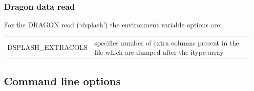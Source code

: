 \documentclass[a4paper,10pt]{article}
\begin{document}
\subsubsection{ Dragon data read}
 For the DRAGON read (`dsplash') the environment variable options are:\newline

\begin{tabular}{p{}p{}}
DSPLASH\_EXTRACOLS & specifies number of extra columns present in the file which are dumped after the itype array
\end{tabular}


\subsection{Command line options}
\label{sec:commandline}
\end{document}

